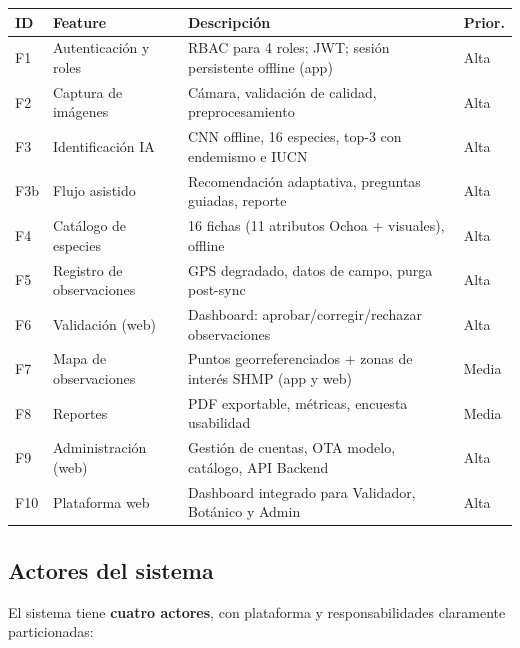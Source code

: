 \documentclass[12pt, a4paper]{article}
\begin{document}
\begin{longtable}{|p{0.8cm}|p{3.5cm}|p{7cm}|p{1.8cm}|}
\hline
\textbf{ID} & \textbf{Feature} & \textbf{Descripci\'on} & \textbf{Prior.} \\
\hline
\endhead
F1 & Autenticaci\'on y roles & RBAC para 4 roles; JWT; sesi\'on persistente offline (app) & Alta \\
\hline
F2 & Captura de im\'agenes & C\'amara, validaci\'on de calidad, preprocesamiento & Alta \\
\hline
F3 & Identificaci\'on IA & CNN offline, 16 especies, top-3 con endemismo e IUCN & Alta \\
\hline
F3b & Flujo asistido & Recomendaci\'on adaptativa, preguntas guiadas, reporte & Alta \\
\hline
F4 & Cat\'alogo de especies & 16 fichas (11 atributos Ochoa + visuales), offline & Alta \\
\hline
F5 & Registro de observaciones & GPS degradado, datos de campo, purga post-sync & Alta \\
\hline
F6 & Validaci\'on (web) & Dashboard: aprobar/corregir/rechazar observaciones & Alta \\
\hline
F7 & Mapa de observaciones & Puntos georreferenciados + zonas de inter\'es SHMP (app y web) & Media \\
\hline
F8 & Reportes & PDF exportable, m\'etricas, encuesta usabilidad & Media \\
\hline
F9 & Administraci\'on (web) & Gesti\'on de cuentas, OTA modelo, cat\'alogo, API Backend & Alta \\
\hline
F10 & Plataforma web & Dashboard integrado para Validador, Bot\'anico y Admin & Alta \\
\hline
\end{longtable}

\subsection{Actores del sistema}

El sistema tiene \textbf{cuatro actores}, con plataforma y responsabilidades claramente particionadas:
\end{document}
